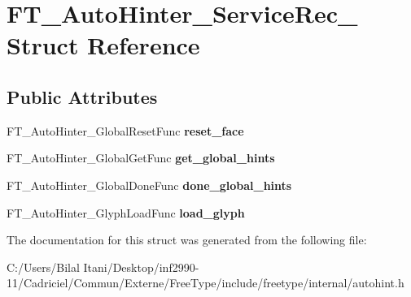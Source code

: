 \hypertarget{struct_f_t___auto_hinter___service_rec__}{}\section{F\+T\+\_\+\+Auto\+Hinter\+\_\+\+Service\+Rec\+\_\+ Struct Reference}
\label{struct_f_t___auto_hinter___service_rec__}
\subsection*{Public Attributes}
\begin{DoxyCompactItemize}
\item 
F\+T\+\_\+\+Auto\+Hinter\+\_\+\+Global\+Reset\+Func {\bfseries reset\+\_\+face}\hypertarget{struct_f_t___auto_hinter___service_rec___a846234a9c9c5427d3274e4568f33272c}{}\label{struct_f_t___auto_hinter___service_rec___a846234a9c9c5427d3274e4568f33272c}

\item 
F\+T\+\_\+\+Auto\+Hinter\+\_\+\+Global\+Get\+Func {\bfseries get\+\_\+global\+\_\+hints}\hypertarget{struct_f_t___auto_hinter___service_rec___a958371c33e08125393cd4b401a22f2a0}{}\label{struct_f_t___auto_hinter___service_rec___a958371c33e08125393cd4b401a22f2a0}

\item 
F\+T\+\_\+\+Auto\+Hinter\+\_\+\+Global\+Done\+Func {\bfseries done\+\_\+global\+\_\+hints}\hypertarget{struct_f_t___auto_hinter___service_rec___a648ac943fc1194f60ba638e0a59486e9}{}\label{struct_f_t___auto_hinter___service_rec___a648ac943fc1194f60ba638e0a59486e9}

\item 
F\+T\+\_\+\+Auto\+Hinter\+\_\+\+Glyph\+Load\+Func {\bfseries load\+\_\+glyph}\hypertarget{struct_f_t___auto_hinter___service_rec___ad36efe39469959626744ebdd04a04031}{}\label{struct_f_t___auto_hinter___service_rec___ad36efe39469959626744ebdd04a04031}

\end{DoxyCompactItemize}


The documentation for this struct was generated from the following file\+:\begin{DoxyCompactItemize}
\item 
C\+:/\+Users/\+Bilal Itani/\+Desktop/inf2990-\/11/\+Cadriciel/\+Commun/\+Externe/\+Free\+Type/include/freetype/internal/autohint.\+h\end{DoxyCompactItemize}
